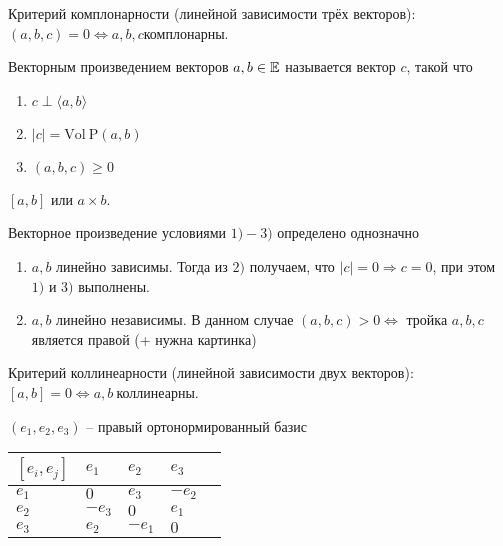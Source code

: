 Критерий комплонарности (линейной зависимости трёх векторов): $(a, b, c) = 0 \iff a, b, c \text{комплонарны}$.

\begin{Def}
  Векторным произведением векторов $a, b \in \mathbb{E}$ называется вектор $c$, такой что
  \begin{enumerate}
    \item $c \perp \langle a, b \rangle$
    \item $|c| = \mathrm{Vol\ P}(a, b)$
    \item $(a, b, c) \geqslant 0$
  \end{enumerate}
  \begin{Designation}
    $[a, b]$ или $a \times b$.
  \end{Designation}
\end{Def}

\begin{Comment}
  Векторное произведение условиями $1) - 3)$ определено однозначно
  \begin{enumerate}
    \item $a, b$ линейно зависимы. Тогда из $2)$ получаем, что $|c| = 0 \Rightarrow c = 0$, при этом $1)$ и $3)$ выполнены.
    \item $a, b$ линейно независимы. В данном случае $(a, b, c) > 0 \iff $ тройка $a, b, c$ является правой (+ нужна картинка)
  \end{enumerate}
\end{Comment}

Критерий коллинеарности (линейной зависимости двух векторов): $[a, b] = 0 \iff a, b\ \text{коллинеарны}$.

\begin{Examples}
  $(e_1, e_2, e_3)$ -- правый ортонормированный базис
  \begin{table}[h]
    \centering
    \begin{tabular}{l|l|l|l|l}
     $[e_i, e_j]$ & $e_1$ & $e_2$  & $e_3$   \\ \hline
      $e_1$       & $0$                        & $e_3$  & $-e_2$  \\ \hline
      $e_2$       & $-e_3$                     & $0$    & $e_1$   \\ \hline
      $e_3$       & $e_2$                      & $-e_1$ & $0$
    \end{tabular}
  \end{table}
\end{Examples}

